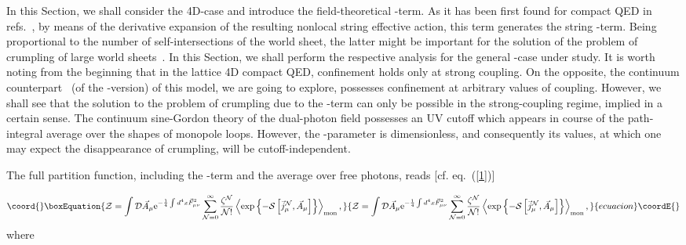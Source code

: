 \documentclass[a4paper,12pt]{article}
\begin{document}
In this Section, we shall consider the 4D-case and introduce the field-theoretical \myHighlight{$\theta$}\coordHE{}-term.
As it has been first found for compact QED in refs.~\cite{cristina, tq}, by means of the derivative expansion of the resulting nonlocal string effective action,
this term generates the string \myHighlight{$\theta$}\coordHE{}-term. Being proportional to the number of self-intersections of the world sheet,
the latter might be important for the solution of the problem of crumpling of large world sheets~\cite{dg}.
In this Section, we shall perform the respective analysis for the general \coordHE{}-case under study.
It is worth noting from the beginning that in the lattice 4D compact QED, confinement holds only at strong coupling. On the opposite,
the continuum counterpart~\cite{cristina, tq} (of the \coordHE{}-version) of this model, we are going to explore,
possesses confinement at arbitrary values of coupling. However, we shall see that the solution to the problem of crumpling
due to the \myHighlight{$\theta$}\coordHE{}-term can only be possible in the strong-coupling regime, implied in a certain sense.
The continuum
sine-Gordon theory of the dual-photon field possesses an UV cutoff which appears in course of the path-integral average over the shapes of
monopole loops.
However, the \myHighlight{$\theta$}\coordHE{}-parameter is dimensionless, and consequently its values,
at which one may expect the disappearance of crumpling, will be cutoff-independent.

The full partition function, including the \myHighlight{$\theta$}\coordHE{}-term and the average over free photons, reads [cf. eq.~(\ref{1})]

\begin{equation}\coord{}\boxEquation{
\label{Z4D}
{\cal Z}=\int {\cal D}\vec A_\mu{\rm e}^{-\frac14\int d^4x\vec F_{\mu\nu}^2}\sum\limits_{{\cal N}=0}^{\infty}
\frac{\zeta^{\cal N}}{{\cal N}!}\left<\exp\left\{-{\cal S}\left[\vec j_\mu^{\cal N}, \vec A_\mu\right]\right\}\right>_{\rm mon},
}{
{\cal Z}=\int {\cal D}\vec A_\mu{\rm e}^{-\frac14\int d^4x\vec F_{\mu\nu}^2}\sum\limits_{{\cal N}=0}^{\infty}
\frac{\zeta^{\cal N}}{{\cal N}!}\left<\exp\left\{-{\cal S}\left[\vec j_\mu^{\cal N}, \vec A_\mu\right]\right\}\right>_{\rm mon},
}{ecuacion}\coordE{}\end{equation}
where
\end{document}
